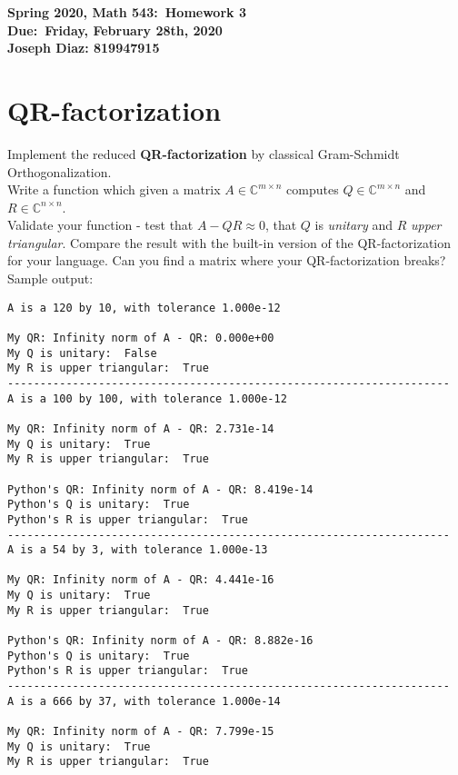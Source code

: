 \documentclass{article}
\begin{document}
	\begin{large}
	\begin{center}
		\textbf{Spring 2020, Math 543:\ Homework 3} \\
		\textbf{Due:\ Friday, February 28th, 2020} \\
		\textbf{Joseph Diaz: 819947915}
	\end{center}
\noindent\makebox[\linewidth]{\rule{\paperwidth}{0.4pt}}
	\section*{QR-factorization}
	Implement the reduced \textbf{QR-factorization} by classical Gram-Schmidt Orthogonalization.\\
	Write a function which given a matrix $A \in \mathbb{C}^{m\times n}$ computes $Q \in \mathbb{C}^{m\times n}$ and $R \in \mathbb{C}^{n\times n}$. \\
	Validate your function - test that $A - QR \approx 0$, that $Q$ is \textit{unitary} and $R$ \textit{upper triangular}. Compare the result with the built-in version of the QR-factorization for your language. Can you find a matrix where your QR-factorization breaks?\\
\noindent\makebox[\linewidth]{\rule{\paperwidth}{0.4pt}}
Sample output:
\begin{lstlisting}
A is a 120 by 10, with tolerance 1.000e-12

My QR: Infinity norm of A - QR: 0.000e+00
My Q is unitary:  False
My R is upper triangular:  True
--------------------------------------------------------------------
A is a 100 by 100, with tolerance 1.000e-12

My QR: Infinity norm of A - QR: 2.731e-14
My Q is unitary:  True
My R is upper triangular:  True

Python's QR: Infinity norm of A - QR: 8.419e-14
Python's Q is unitary:  True
Python's R is upper triangular:  True
--------------------------------------------------------------------
A is a 54 by 3, with tolerance 1.000e-13

My QR: Infinity norm of A - QR: 4.441e-16
My Q is unitary:  True
My R is upper triangular:  True

Python's QR: Infinity norm of A - QR: 8.882e-16
Python's Q is unitary:  True
Python's R is upper triangular:  True
--------------------------------------------------------------------
A is a 666 by 37, with tolerance 1.000e-14

My QR: Infinity norm of A - QR: 7.799e-15
My Q is unitary:  True
My R is upper triangular:  True


\end{lstlisting}
\end{large}
\end{document}
